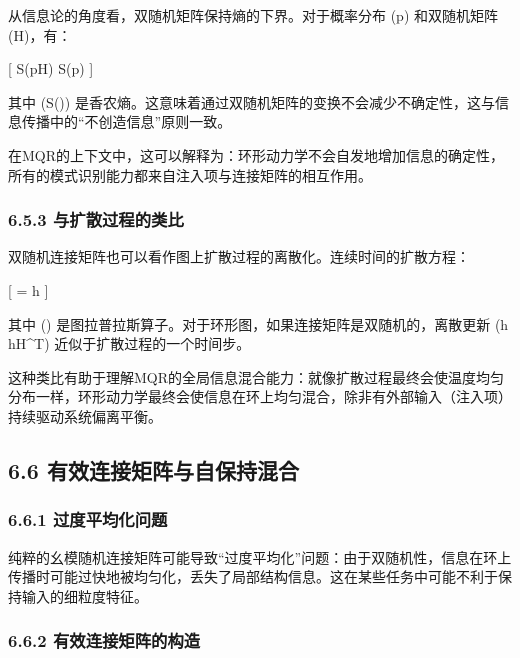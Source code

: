 \documentclass[
  12pt,
]{article}
\begin{document}
从信息论的角度看，双随机矩阵保持熵的下界。对于概率分布 (p) 和双随机矩阵
(H)，有：

{[} S(pH) \geq S(p) {]}

其中 (S(\cdot))
是香农熵。这意味着通过双随机矩阵的变换不会减少不确定性，这与信息传播中的``不创造信息''原则一致。

在MQR的上下文中，这可以解释为：环形动力学不会自发地增加信息的确定性，所有的模式识别能力都来自注入项与连接矩阵的相互作用。

\hypertarget{ux4e0eux6269ux6563ux8fc7ux7a0bux7684ux7c7bux6bd4}{%
\subsubsection{6.5.3
与扩散过程的类比}\label{ux4e0eux6269ux6563ux8fc7ux7a0bux7684ux7c7bux6bd4}}

双随机连接矩阵也可以看作图上扩散过程的离散化。连续时间的扩散方程：

{[}  = \Delta h {]}

其中 (\Delta)
是图拉普拉斯算子。对于环形图，如果连接矩阵是双随机的，离散更新 (h
\leftarrow hH\^{}T) 近似于扩散过程的一个时间步。

这种类比有助于理解MQR的全局信息混合能力：就像扩散过程最终会使温度均匀分布一样，环形动力学最终会使信息在环上均匀混合，除非有外部输入（注入项）持续驱动系统偏离平衡。

\hypertarget{ux6709ux6548ux8fdeux63a5ux77e9ux9635ux4e0eux81eaux4fddux6301ux6df7ux5408}{%
\subsection{6.6
有效连接矩阵与自保持混合}\label{ux6709ux6548ux8fdeux63a5ux77e9ux9635ux4e0eux81eaux4fddux6301ux6df7ux5408}}

\hypertarget{ux8fc7ux5ea6ux5e73ux5747ux5316ux95eeux9898}{%
\subsubsection{6.6.1
过度平均化问题}\label{ux8fc7ux5ea6ux5e73ux5747ux5316ux95eeux9898}}

纯粹的幺模随机连接矩阵可能导致``过度平均化''问题：由于双随机性，信息在环上传播时可能过快地被均匀化，丢失了局部结构信息。这在某些任务中可能不利于保持输入的细粒度特征。

\hypertarget{ux6709ux6548ux8fdeux63a5ux77e9ux9635ux7684ux6784ux9020}{%
\subsubsection{6.6.2
有效连接矩阵的构造}\label{ux6709ux6548ux8fdeux63a5ux77e9ux9635ux7684ux6784ux9020}}
\end{document}
